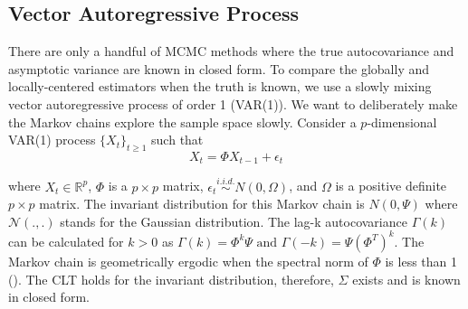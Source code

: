\documentclass[11pt]{article}
\theoremstyle{remark}
\begin{document}


\subsection{Vector Autoregressive Process} \label{ex:var}

There are only a handful of MCMC methods where the true autocovariance and asymptotic variance are known in closed form. To compare the globally and locally-centered estimators when the truth is known, we use a slowly mixing vector autoregressive process of order 1 (VAR(1)). We want to deliberately make the Markov chains explore the sample space slowly. Consider a $p$-dimensional VAR(1) process $\{X_t\}_{t \geq 1}$ such that
%
\[
X_t = \Phi X_{t-1} + \epsilon_t
\]

where $X_t \in \mathbb{R}^p$, $\Phi $ is a $p \times p $ matrix, $ \epsilon_t \overset{i.i.d.}{\sim} N(0, \Omega)$, and $\Omega$ is a positive definite $p \times p$ matrix. The invariant distribution for this Markov chain is $N(0, \Psi)$ where $\mathcal{N}(.,.)$ stands for the Gaussian distribution. The lag-k autocovariance $\Gamma(k)$ can be calculated for $k >0$ as $\Gamma(k) = \Phi^k\Psi \textrm{ and } \Gamma(-k) = \Psi(\Phi^T)^k$. The Markov chain is geometrically ergodic when the spectral norm of $\Phi$ is less than 1 (\cite{10.2307/1427459}). The CLT holds for the invariant distribution, therefore, $\Sigma$ exists and is known in closed form.
\end{document}
